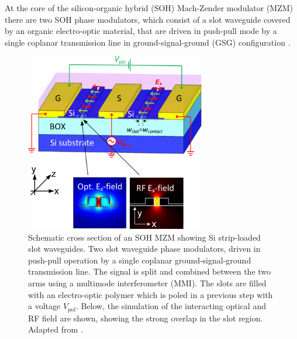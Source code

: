 

At the core of the silicon-organic hybrid (SOH) Mach-Zender modulator (MZM) there are two SOH phase modulators, which consist of a slot waveguide covered by an organic electro-optic material, that are driven in push-pull mode by a single coplanar transmission line in ground-signal-ground (GSG) configuration \cite{Koos_SOH2015}. 

\begin{figure}[!ht]
\centering
  \includegraphics[width=0.7\textwidth]{figs/striploadedWG}
  \caption{Schematic cross section of an SOH MZM showing Si strip-loaded slot waveguides. Two slot waveguide phase modulators, driven in push-pull operation by a single coplanar ground-signal-ground transmission line. The signal is split and combined between the two arms using a multimode interferometer (MMI). The slots are filled with an electro-optic polymer which is poled in a previous step with a voltage $V_\text{pol}$. Below, the simulation of the interacting optical and RF field are shown, showing the strong overlap in the slot region. Adapted from \cite{Koos_SOH2015}.}
  \label{fig:striploadedWG}
\end{figure}

